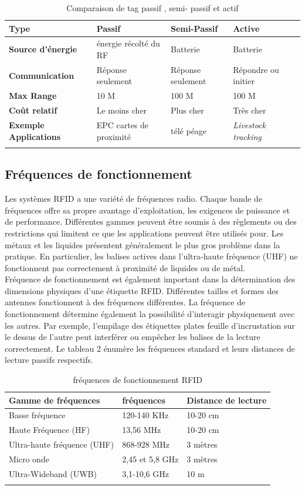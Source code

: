 \documentclass[11pt, a4paper, twoside]{book}
\begin{document}
\begin{longtable}{|p{}|p{}|p{}| p{}| p{}|}
\hline
\textbf{Type} & \textbf{Passif} & \textbf{Semi-Passif} & \textbf{Active} \\
\hline
\textbf{Source d'énergie} & énergie récolté du RF & Batterie & Batterie \\
\hline
\textbf{Communication} & Réponse seulement & Réponse seulement & Répondre ou initier \\
\hline
\textbf{Max Range} & 10 M & 100 M &  100 M \\
\hline
\textbf{Coût relatif} & Le moins cher & Plus cher & Très cher \\
\hline
\textbf{Exemple Applications} & EPC cartes de proximité & télé péage &  \emph {Livestock tracking} \\
\hline
\caption{Comparaison de tag passif , semi- passif et actif}
\end{longtable}


\subsection{Fréquences de fonctionnement}
Les systèmes RFID a une variété de fréquences radio. Chaque bande de fréquences offre sa propre avantage d'exploitation, les exigences de puissance et de performance. Différentes gammes peuvent être soumis à des règlements ou des restrictions qui limitent ce que les applications peuvent être utilisés pour.
Les métaux et les liquides présentent généralement le plus gros problème dans la pratique. En particulier, les balises actives dans l'ultra-haute fréquence (UHF) ne fonctionnent pas correctement à proximité de liquides ou de métal.\\


Fréquence de fonctionnement est également important dans la détermination des dimensions physiques d'une étiquette RFID. Différentes tailles et formes des antennes fonctionnent à des fréquences différentes. La fréquence de fonctionnement détermine également la possibilité d'interagir physiquement avec les autres. Par exemple, l'empilage des étiquettes plates feuille d'incrustation sur le dessus de l'autre peut interférer ou empêcher les balises de la lecture correctement. Le tableau 2 énumère les fréquences standard et leurs distances de lecture passifs respectifs.\\
\begin{longtable}{|p{}|p{}|p{}|}
\hline
\textbf{Gamme de fréquences} & \textbf{fréquences} & \textbf{Distance de lecture} \\
\hline
Basse fréquence & 120-140 KHz & 10-20 cm  \\
\hline
Haute Fréquence (HF) & 13,56 MHz & 10-20 cm \\
\hline
Ultra-haute fréquence (UHF) & 868-928 MHz & 3 mètres \\
\hline
Micro onde & 2,45 et 5,8 GHz & 3 mètres \\
\hline
Ultra-Wideband (UWB) & 3,1-10,6 GHz & 10 m \\
\hline
\caption{fréquences de fonctionnement RFID}
\end{longtable}
\end{document}
